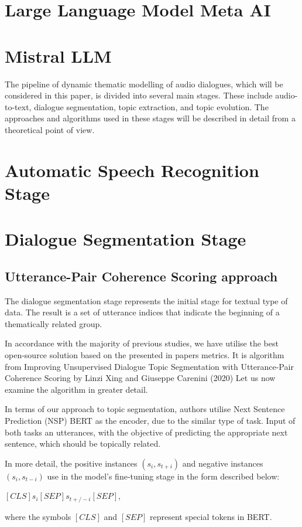 \documentclass[PMI,VKR]{HSEUniversity}
\begin{document}
\section{Large Language Model Meta AI}


\section{Mistral LLM}






The pipeline of dynamic thematic modelling of audio dialogues, which will be considered in this paper, is divided into several main stages. 
These include audio-to-text, dialogue segmentation, topic extraction, and topic evolution. 
The approaches and algorithms used in these stages will be described in detail from a theoretical point of view.

\section{Automatic Speech Recognition Stage}


\section{Dialogue Segmentation Stage}

\subsection{Utterance-Pair Coherence Scoring approach}
The dialogue segmentation stage represents the initial stage for textual type of data. 
The result is a set of utterance indices that indicate the beginning of a thematically related group. 

In accordance with the majority of previous studies, we have utilise the best open-source solution based on the presented in papers metrics. 
It is algorithm from Improving Unsupervised Dialogue Topic Segmentation with Utterance-Pair Coherence Scoring by Linzi Xing and Giuseppe Carenini (2020)
Let us now examine the algorithm in greater detail. 

In terms of our approach to topic segmentation, authors utilise Next Sentence Prediction (NSP) BERT as the encoder, due to the similar type of task. 
Input of both tasks an utterances, with the objective of predicting the appropriate next sentence, which should be topically related. 

In more detail, the positive instances $(s_{i}, s_{t+i})$ and negative instances $(s_{i}, s_{t-i})$ use in the model's fine-tuning stage  in the form described below: 
\begin{center}
    $[CLS] s_{i} [SEP] s_{t+/-i} [SEP]$,
\end{center}
where the symbols $[CLS]$ and $[SEP]$ represent special tokens in BERT. 
\end{document}
